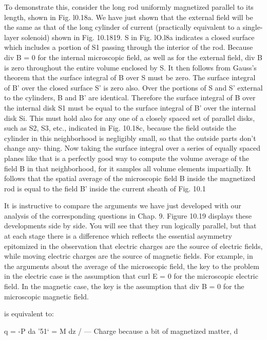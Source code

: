 {To demonstrate this, consider the long rod uniformly magnetized
parallel to its length, shown in Fig. l0.18a. We have just shown that
the external field will be the same as that of the long cylinder of current
(practically equivalent to a single-layer solenoid) shown in
Fig. 10.1819. S in Fig. lO.l8a indicates a closed surface which includes
a portion of S1 passing through the interior of the rod.
Because div B = 0 for the internal microscopic field, as well as for
the external field, div B is zero throughout the entire volume enclosed
by S. It then follows from Gauss's theorem that the surface integral
of B over S must be zero. The surface integral of B' over the closed
surface S' is zero also. Over the portions of S and S' external to the
cylinders, B and B' are identical. Therefore the surface integral of B
over the internal disk S1 must be equal to the surface integral of B'
over the internal disk Si. This must hold also for any one of a closely
spaced set of parallel disks, such as S2, S3, etc., indicated in
Fig. 10.18c, because the field outside the cylinder in this neighborhood
is negligibly small, so that the outside parts don't change any-
thing. Now taking the surface integral over a series of equally spaced
planes like that is a perfectly good way to compute the volume
average of the field B in that neighborhood, for it samples all volume
elements impartially. It follows that the spatial average of the microscopic
field B inside the magnetized rod is equal to the field B' inside
the current sheath of Fig. 10.1%

It is instructive to compare the arguments we have just developed
with our analysis of the corresponding questions in Chap. 9. Figure
10.19 displays these developments side by side. You will see that
they run logically parallel, but that at each stage there is a difference
which reflects the essential asymmetry epitomized in the observation
that electric charges are the source of electric fields, while moving
electric charges are the source of magnetic fields. For example, in
the arguments about the average of the microscopic field, the key
to the problem in the electric case is the assumption that curl E = 0
for the microscopic electric field. In the magnetic case, the key is
the assumption that div B = 0 for the microscopic magnetic field.

is equivalent to:

     

q = -P da '51‘ = M dz
/ ---  Charge because a bit of magnetized matter, d

}
